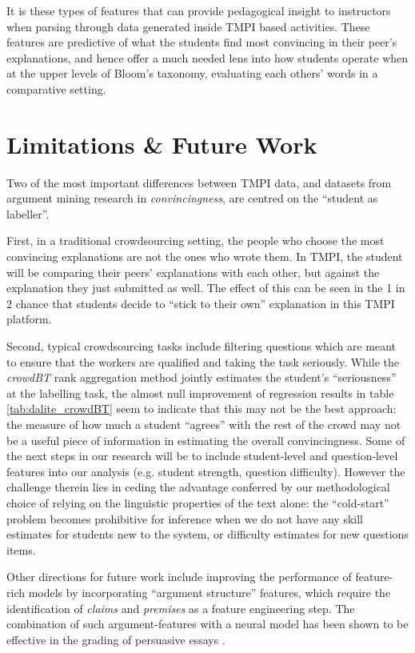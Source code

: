 \documentclass[notitlepage,12pt]{jedm}
\begin{document}
It is these types of features that can provide pedagogical insight to 
instructors when parsing through data generated inside TMPI based activities.
These features are predictive of what the students find most convincing in 
their peer's explanations, and hence offer a much needed lens into how students 
operate when at the upper levels of Bloom's taxonomy, evaluating each others' 
words in a comparative setting.

\section{Limitations \& Future Work}

Two of the most important differences between TMPI data, and datasets from 
argument mining research in \textit{convincingness}, are centred on the 
``student as labeller''. 

First, in a traditional crowdsourcing setting, the people who choose the most 
convincing explanations are not the ones who wrote them.
In TMPI, the student will be comparing their peers' explanations with each 
other, but against the explanation they just submitted as well.
The effect of this can be seen in the 1 in 2 chance that students decide to 
``stick to their own'' explanation in this TMPI platform. 

Second, typical crowdsourcing tasks include filtering questions which are meant 
to ensure that the workers are qualified and taking the task seriously.
While the \textit{crowdBT} rank aggregation method jointly estimates the 
student's ``seriousness'' at the labelling task, the almost null improvement of 
regression results in table \ref{tab:dalite_crowdBT} seem to indicate that this 
may not be the best approach: the measure of how much a student ``agrees'' with 
the rest of the crowd may not be a useful piece of information in estimating 
the overall convincingness.
Some of the next steps in our research will be to include student-level and 
question-level features into our analysis (e.g. student strength, question 
difficulty).
However the challenge therein lies in ceding the advantage conferred by our 
methodological choice of relying on the linguistic properties of the text 
alone: the ``cold-start'' problem becomes prohibitive for inference when we do 
not have any skill estimates for students new to the system, or difficulty 
estimates for new questions items.

Other directions for future work include improving the performance of 
feature-rich models by incorporating ``argument structure'' features, which 
require the identification of \textit{claims} and \textit{premises} as a 
feature engineering step.
The combination of such argument-features with a neural model has been shown to 
be effective in the grading of persuasive essays \cite{nguyen_argument_2018}.
\end{document}
